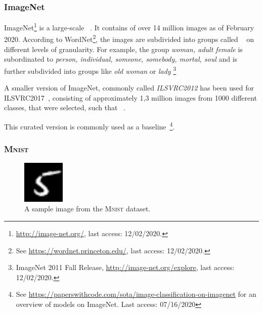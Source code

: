 \subsubsection{ImageNet}\label{ssec:imagenet}

ImageNet\footnote{\href{http://image-net.org/}{http://image-net.org/}, last access: 12/02/2020.} is a large-scale ~\citep{imagenet_cvpr09}.
It contains of over 14 million images as of February 2020.
According to WordNet\footnote{See \href{https://wordnet.princeton.edu/}{https://wordnet.princeton.edu/}, last access: 12/02/2020.}, the images are subdivided into groups called ~\citep{imagenet_cvpr09} on different levels of granularity.
For example, the group \textit{woman, adult female} is subordinated to \textit{person, individual, someone, somebody, mortal, soul} and is further subdivided into groups like \textit{old woman} or \textit{lady} \footnote{ImageNet 2011 Fall Release, \href{http://image-net.org/explore}{http://image-net.org/explore}, last access: 12/02/2020.}

A smaller version of ImageNet, commonly called \textit{ILSVRC2012} has been used for \ac{ILSVRC2017}~\citep{ILSVRC15}, consisting of approximately 1,3 million images from 1000 different classes, that were selected, such that ~\citep{imagenet_cvpr09}.

This curated version is commonly used as a baseline~\citep{krizhevsky2012imagenet,Szegedy_2015_CVPR}\footnote{See \href{https://paperswithcode.com/sota/image-classification-on-imagenet}{https://paperswithcode.com/sota/image-classification-on-imagenet} for an overview of models on ImageNet. Last access: 07/16/2020}.

\subsubsection{\textsc{Mnist}}\label{subsubsec:mnist}

\begin{figure}
    \begin{center}
        \includegraphics[width=0.18\textwidth]{images/mnist_sample.png}
    \end{center}
    \caption[\textsc{Mnist} dataset sample image]{A sample image from the \textsc{Mnist} dataset.}
    \label{fig:mnist_sample}
\end{figure}

